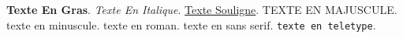\documentclass{article}
\begin{document}
	\textbf{Texte En Gras}. 
	\textit{Texte En Italique}. 
	\underline{Texte Souligne}. 
	\uppercase{Texte En Majuscule}. 
	\lowercase{Texte En Minuscule}.
	\textrm{texte en roman}. 
	\textsf{texte en sans serif}. 
	\texttt{texte en teletype}. 
\end{document}
